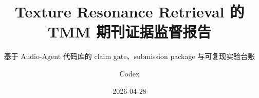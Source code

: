 \documentclass[UTF8,11pt]{ctexrep}
\title{Texture Resonance Retrieval 的 TMM 期刊证据监督报告}
\subtitle{基于 Audio-Agent 代码库的 claim gate、submission package 与可复现实验台账}
\author{Codex}
\date{2026-04-28}
\begin{document}
\makecustomtitle
\tableofcontents
\clearpage

\end{document}
